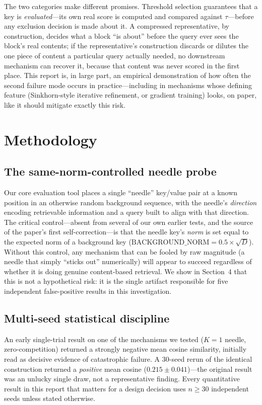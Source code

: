 \documentclass[11pt]{article}
\begin{document}
The two categories make different promises. Threshold selection guarantees that a key is
\emph{evaluated}---its own real score is computed and compared against $\tau$---before
any exclusion decision is made about it. A compressed representative, by construction,
decides what a block ``is about'' before the query ever sees the block's real contents; if
the representative's construction discards or dilutes the one piece of content a
particular query actually needed, no downstream mechanism can recover it, because that
content was never scored in the first place. This report is, in large part, an empirical
demonstration of how often the second failure mode occurs in practice---including in
mechanisms whose defining feature (Sinkhorn-style iterative refinement, or gradient
training) looks, on paper, like it should mitigate exactly this risk.

\section{Methodology}

\subsection{The same-norm-controlled needle probe}

Our core evaluation tool places a single ``needle'' key/value pair at a known position in an
otherwise random background sequence, with the needle's \emph{direction} encoding
retrievable information and a query built to align with that direction. The critical
control---absent from several of our own earlier tests, and the source of the paper's
first self-correction---is that the needle key's \emph{norm} is set equal to the
expected norm of a background key ($\mathrm{BACKGROUND\_NORM} = 0.5 \times \sqrt{D}$).
Without this control, any mechanism that can be fooled by raw magnitude (a needle that
simply ``sticks out'' numerically) will appear to succeed regardless of whether it is doing
genuine content-based retrieval. We show in Section~4 that this is not a hypothetical
risk: it is the single artifact responsible for five independent false-positive results in
this investigation.

\subsection{Multi-seed statistical discipline}

An early single-trial result on one of the mechanisms we tested ($K{=}1$ needle,
zero-competition) returned a strongly negative mean cosine similarity, initially read as
decisive evidence of catastrophic failure. A 30-seed rerun of the identical construction
returned a \emph{positive} mean cosine ($0.215 \pm 0.041$)---the original
result was an unlucky single draw, not a representative finding. Every quantitative result
in this report that matters for a design decision uses $n \geq 30$ independent
seeds unless stated otherwise.
\end{document}
